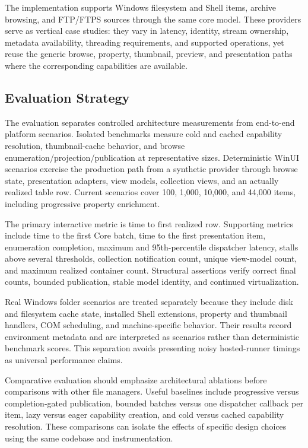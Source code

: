 \documentclass[10pt,a4paper,twoside]{article}
\begin{document}
The implementation supports Windows filesystem and Shell items, archive browsing, and FTP/FTPS sources through
the same core model. These providers serve as vertical case studies: they vary in latency, identity, stream
ownership, metadata availability, threading requirements, and supported operations, yet reuse the generic browse,
property, thumbnail, preview, and presentation paths where the corresponding capabilities are available.

\subsection{Evaluation Strategy}

The evaluation separates controlled architecture measurements from end-to-end platform scenarios. Isolated
benchmarks measure cold and cached capability resolution, thumbnail-cache behavior, and browse
enumeration/projection/publication at representative sizes. Deterministic WinUI scenarios exercise the production
path from a synthetic provider through browse state, presentation adapters, view models, collection views, and an
actually realized table row. Current scenarios cover 100, 1,000, 10,000, and 44,000 items, including progressive
property enrichment.

The primary interactive metric is time to first realized row. Supporting metrics include time to the first Core
batch, time to the first presentation item, enumeration completion, maximum and 95th-percentile dispatcher
latency, stalls above several thresholds, collection notification count, unique view-model count, and maximum
realized container count. Structural assertions verify correct final counts, bounded publication, stable model
identity, and continued virtualization.

Real Windows folder scenarios are treated separately because they include disk and filesystem cache state,
installed Shell extensions, property and thumbnail handlers, COM scheduling, and machine-specific behavior.
Their results record environment metadata and are interpreted as scenarios rather than deterministic benchmark
scores. This separation avoids presenting noisy hosted-runner timings as universal performance claims.

Comparative evaluation should emphasize architectural ablations before comparisons with other file managers.
Useful baselines include progressive versus completion-gated publication, bounded batches versus one dispatcher
callback per item, lazy versus eager capability creation, and cold versus cached capability resolution. These
comparisons can isolate the effects of specific design choices using the same codebase and instrumentation.
\end{document}
